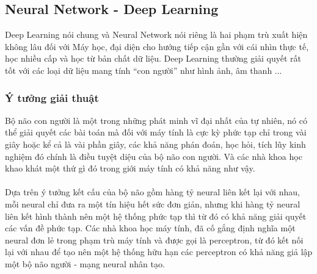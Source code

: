 \subsection{Neural Network - Deep Learning}
Deep Learning nói chung và Neural Network nói riêng là hai phạm trù xuất hiện 
không lâu đối với Máy học, đại diện cho hướng tiếp cận gần với 
cái nhìn thực tế, học nhiều cấp và học từ bản chất dữ liệu. Deep Learning 
thường giải quyết rất tốt với các loại dữ liệu mang tính ``con người'' như 
hình ảnh, âm thanh ... \cite{NeuralNetworksandDeepLearning} 
\subsubsection{Ý tưởng giải thuật}
Bộ não con người là một trong những phát minh vĩ đại nhất của tự nhiên, nó 
có thể giải quyết các bài toán mà đối với máy tính là cực kỳ phức tạp chỉ trong 
vài giây hoặc kể cả là vài phần giây, các khả năng phán đoán, học hỏi, tích lũy 
kinh nghiệm đó chính là điều tuyệt diệu của bộ não con người. Và các nhà khoa học 
khao khát một thứ gì đó trong giới máy tính có khả năng như vậy.\\\\
Dựa trên ý tưởng kết cấu của bộ não gồm hàng tỷ neural liên kết lại với nhau, 
mỗi neural chỉ đưa ra một tín hiệu hết sức đơn giản, nhưng khi hàng tỷ neural liên kết 
hình thành nên một hệ thống phức tạp thì từ đó có khả năng giải quyết các vấn đề 
phức tạp. Các nhà khoa học máy tính, đã cố gắng định nghĩa một neural đơn lẻ 
trong phạm trù máy tính và được gọi là perceptron, từ đó kết nối lại với nhau 
để tạo nên một hệ thống hữu hạn các perceptron có khả năng giả lập một bộ não 
người - mạng neural nhân tạo.

